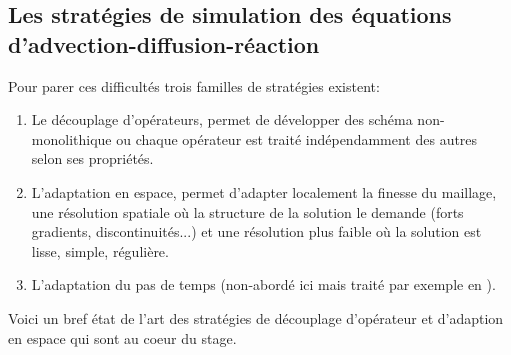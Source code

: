 \subsection{Les stratégies de simulation des équations d'advection-diffusion-réaction}
    \label{par:intro_etat_art}
    Pour parer ces difficultés trois familles de stratégies existent:
    \begin{enumerate}[label=\Alph*.]
        \item Le découplage d’opérateurs, permet de développer des schéma non-monolithique ou chaque opérateur est traité indépendamment des autres selon ses propriétés. 
        \item L'adaptation en espace, permet d'adapter localement la finesse du maillage, une résolution spatiale où la structure de la solution le demande (forts gradients, discontinuités...)
        et une résolution plus faible où la solution est lisse, simple, régulière.
        \item L'adaptation du pas de temps (non-abordé ici mais traité par exemple en \cite{duart2011}).
    \end{enumerate}
    Voici un bref état de l'art des stratégies de découplage d'opérateur et d'adaption en espace qui sont au coeur du stage.
